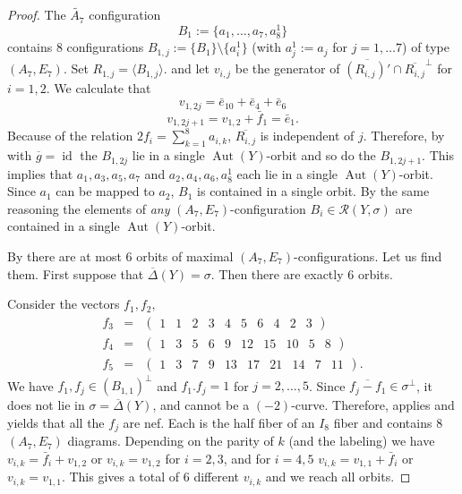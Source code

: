 \documentclass[a4paper]{amsart}
\theoremstyle{definition}
\theoremstyle{plain}
\DeclareMathOperator{\id}{id}
\DeclareMathOperator{\Aut}{Aut}
\newcommand{\R}{\mathcal{R}}
\newcommand{\DeltabarY}{\overline{\Delta}(Y)}
\begin{document}
\begin{proof}
The $\widetilde{A_7}$ configuration \[B_1:= \{a_1,\dots, a_7,a_8^1\}\] contains $8$ configurations $B_{1,j}:=\{B_1\}\setminus \{a_i^1\}$ (with $a_j^1:=a_j$ for $j=1,\dots 7$) of type $(A_7,E_7)$. 
Set $R_{1,j}=\langle B_{1,j} \rangle$.
and let $v_{i,j}$ be the generator of $\overline{(R_{i,j})'}\cap \overline{R_{i,j}}^\perp$ for $i=1,2$.
We calculate that
\[v_{1,2j} = \bar e_{10}+ \bar e_4+\bar e_6\]
\[v_{1,2j+1} = v_{1,2}+\bar f_1=\bar e_1.\]
Because of the relation $2f_i = \sum_{k=1}^8 a_{i,k}$,  $\overline{R_{i,j}}$ is independent of $j$.
Therefore, by  with $\overline{g}=\id$ the $B_{1,2j}$ lie in a single $\Aut(Y)$-orbit 
and so do the $B_{1,2j+1}$.
This implies that $a_1,a_3,a_5,a_7$ and $a_2,a_4,a_6,a_8^1$ each lie in a single $\Aut(Y)$-orbit. Since $a_1$ can be mapped to $a_2$, $B_1$ is contained in a single orbit. 
By the same reasoning the elements of \emph{any} $(A_7,E_7)$-configuration $B_i \in \R(Y,\sigma)$ are contained in a single $\Aut(Y)$-orbit. 

By  there are at most $6$ orbits of maximal $(A_7,E_7)$-configurations. Let us find them. First suppose that $\DeltabarY=\sigma$. Then there are exactly $6$ orbits.

Consider the vectors $f_1,f_2,$
\begin{eqnarray}
f_3 &=& \begin{pmatrix}
1&  1&  2&  3&  4&  5&  6&  4&  2&  3
\end{pmatrix}\\
f_4 &=& \begin{pmatrix}
1&  3&  5&  6&  9&  12&  15&  10&  5&  8
\end{pmatrix}\\
f_5 &=& \begin{pmatrix}
1&  3&  7&  9&  13&  17&  21&  14&  7&  11
\end{pmatrix}.
\end{eqnarray}
We have $f_1, f_j \in (B_{1,1})^\perp$ and $f_1.f_j=1$ for $j=2,\dots, 5$. Since $\overline{f_j - f_1} \in \sigma^\perp$, it does not lie in $\sigma=\DeltabarY$, and cannot be a $(-2)$-curve. Therefore,  applies and yields that all the $f_j$ are nef.  
Each is the half fiber of an $I_8$ fiber and contains $8$ $(A_7,E_7)$ diagrams. Depending on the parity of $k$ (and the labeling) we have $v_{i,k} =\bar f_i+v_{1,2}$ or $v_{i,k}= v_{1,2}$ for $i=2,3$, and for $i=4,5$
$v_{i,k}= v_{1,1}+\bar f_i$ or $v_{i,k}=v_{1,1}$. This gives a total of $6$ different $v_{i,k}$ and we reach all orbits. 


\end{proof}
\end{document}
